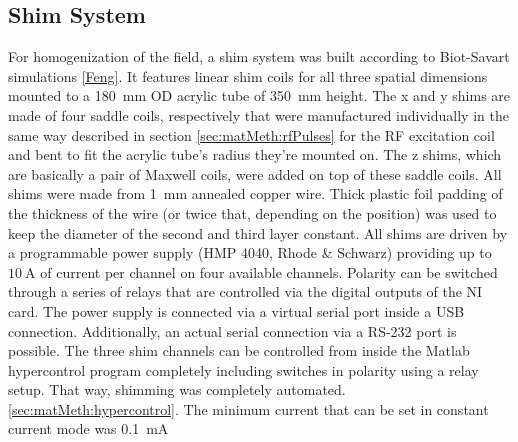         \subsection{Shim System}
        For homogenization of the field, a shim system was built according to Biot-Savart simulations \ref{Feng}. It features linear shim coils for all three spatial dimensions mounted to a \SI{180}{\mm} OD acrylic tube of \SI{350}{\mm} height. The x and y shims are made of four saddle coils, respectively that were manufactured individually in the same way described in section \ref{sec:matMeth:rfPulses} for the RF excitation coil and bent to fit the acrylic tube's radius they're mounted on. The z shims, which are basically a pair of Maxwell coils, were added on top of these saddle coils. All shims were made from \SI{1}{\mm} annealed copper wire. Thick plastic foil padding of the thickness of the wire (or twice that, depending on the position) was used to keep the diameter of the second and third layer constant. All shims are driven by a  programmable power supply (HMP 4040, Rhode \& Schwarz) providing up to $\SI{10}{\ampere}$ of current per channel on four available channels. Polarity can be switched through a series of relays that are controlled via the digital outputs of the NI card. The power supply is connected via a virtual serial port inside a USB connection. Additionally, an actual serial connection via a RS-232 port is possible. The three shim channels can be controlled from inside the Matlab hypercontrol program completely including switches in polarity using a relay setup. That way, shimming was completely automated. \ref{sec:matMeth:hypercontrol}.
        The minimum current that can be set in constant current mode was \SI{0.1}{\milli\ampere}
